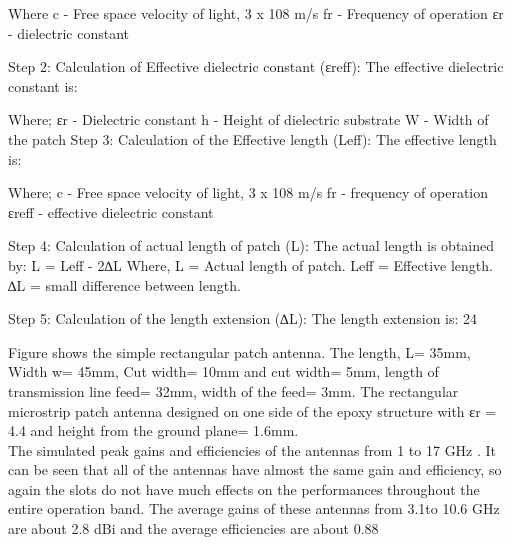 \documentclass[12pt]{article}
\begin{document}
				                 Where
				                     c - Free space velocity of light, 3 x 108 m/s
				                 fr - Frequency of operation
				                 εr - dielectric constant
				                 
				                 Step 2: Calculation of Effective dielectric constant (εreff): 
				                 The effective dielectric constant is:
				                  		  
				                 Where;
				                        εr - Dielectric constant
				                 h - Height of dielectric substrate
				                 W - Width of the patch
				                 Step 3: Calculation of the Effective length (Leff):  
				                 The effective length is:
				                  					      
				                 Where;
				                  c - Free space velocity of light, 3 x 108 m/s
				                 fr - frequency of operation
				                 εreff - effective dielectric constant
				                 
				                 Step 4: Calculation of actual length of patch (L):  
				                 The actual length is obtained by:
				                 L = Leff - 2∆L					
				                 Where,
				                 L 	= Actual length of patch.
				                 Leff 	 = Effective length.
				                 ∆L 	= small difference between length.
				                 
				                 Step 5: Calculation of the length extension (∆L):  
				                 The length extension is:     24
				                 
				                 Figure shows the simple rectangular patch antenna. 
				                 The length, L= 35mm, 
				                 Width w= 45mm,
				                 Cut width= 10mm 
				                 and cut width= 5mm, 
				                 length of transmission line feed= 32mm, 
				                 width of the feed= 3mm. 
				                 The rectangular microstrip patch antenna designed on one side of the epoxy structure with εr = 4.4 and height from the ground plane= 1.6mm. \\
				                 
				                 
				                
				                 The simulated peak gains and efficiencies of the antennas from 1 to 17 GHz . It can be seen that all of the antennas have almost the same gain and efficiency, so again the slots do not have much effects on the performances throughout the entire operation band. The average gains of these antennas from 3.1to 10.6 GHz are about 2.8 dBi and the average efficiencies are about 0.88
				                 
\end{document}
